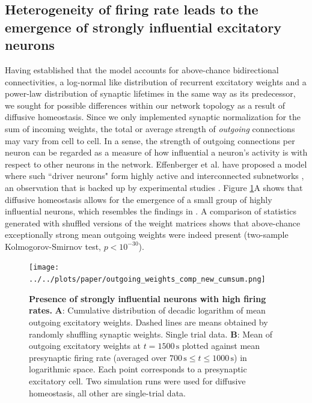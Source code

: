 \documentclass[10pt,letterpaper]{article}
\begin{document}
\subsection*{Heterogeneity of firing rate leads to the emergence of strongly influential excitatory neurons}\label{Section_Mean_outgoing_Weights}
Having established that the model accounts for above-chance bidirectional connectivities, a log-normal like distribution of recurrent excitatory weights and a power-law distribution of synaptic lifetimes in the same way as its predecessor, we sought for possible differences within our network topology as a result of diffusive homeostasis. Since we only implemented synaptic normalization for the sum of incoming weights, the total or average strength of \emph{outgoing} connections may vary from cell to cell. In a sense, the strength of outgoing connections per neuron can be regarded as a measure of how influential a neuron's activity is with respect to other neurons in the network. Effenberger et al. have proposed a model where such ``driver neurons" form highly active and interconnected subnetworks \cite{Effenberger_2015}, an observation that is backed up by experimental studies \cite{Yassin_Subnetworks_2010,Eckmann_Leader_Neurons_2008}. Figure \ref{Outgoing_Weights_Comp}A shows that diffusive homeostasis allows for the emergence of a small group of highly influential neurons, which resembles the findings in \cite{Effenberger_2015}. A comparison of statistics generated with shuffled versions of the weight matrices shows that above-chance exceptionally strong mean outgoing weights were indeed present (two-sample Kolmogorov-Smirnov test, $p < 10^{-30}$).

\begin{figure}
\texttt{[image: ../../plots/paper/outgoing\_weights\_comp\_new\_cumsum.png]}
\caption{{\bf Presence of strongly influential neurons with high firing rates.} \textbf{A}: Cumulative distribution of decadic logarithm of mean outgoing excitatory weights. Dashed lines are means obtained by randomly shuffling synaptic weights. Single trial data. \textbf{B}: Mean of outgoing excitatory weights at $t=\mathrm{1500\,s}$ plotted against mean presynaptic firing rate (averaged over $\mathrm{700\,s \leq} t \mathrm{ \leq 1000\,s}$) in logarithmic space. Each point corresponds to a presynaptic excitatory cell. Two simulation runs were used for diffusive homeostasis, all other are single-trial data.}
\label{Outgoing_Weights_Comp}
\end{figure}
\end{document}
